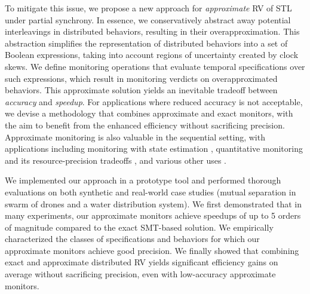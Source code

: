 To mitigate this issue, we propose a new approach for \emph{approximate} RV of STL 
under partial synchrony.
%
In essence, we conservatively abstract away potential interleavings in distributed behaviors, resulting in their overapproximation.
%
This abstraction simplifies the representation of distributed behaviors into a set of Boolean 
expressions, taking into account regions of uncertainty created by clock skews.
%
We define monitoring operations that evaluate temporal specifications over such expressions, 
which result in monitoring verdicts on overapproximated behaviors.
%
This approximate solution yields an inevitable tradeoff between {\em accuracy} and {\em speedup}.
%
%
For applications where reduced accuracy is not acceptable, we devise a methodology that combines approximate and exact monitors, 
with the aim to benefit from the enhanced efficiency without sacrificing 
precision.
%
Approximate monitoring is also valuable in the sequential setting, with applications including
monitoring with state estimation \cite{StollerBSGHSZ11,BartocciG13},
quantitative monitoring and its resource-precision tradeoffs \cite{HenzingerS21,HenzingerMS22,HenzingerMS23},
and various other uses \cite{AlechinaDL14,AcetoAFIL21}.



We implemented our approach in a prototype tool and performed thorough evaluations on both 
synthetic and real-world case studies (mutual separation in swarm of drones and a water distribution 
system).
%
We first demonstrated that in many experiments, our approximate monitors achieve 
speedups of up to 5 orders of magnitude compared to the exact SMT-based solution.
%
We empirically characterized the classes of specifications and behaviors for which our approximate 
monitors achieve good precision.
%
%
We finally showed that combining exact and approximate distributed RV yields significant efficiency gains on average without sacrificing precision, even with low-accuracy approximate monitors.

